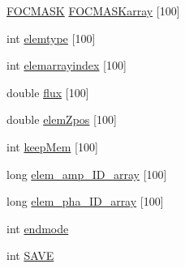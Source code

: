 \begin{DoxyCompactItemize}
\hyperlink{structFOCMASK}{F\+O\+C\+M\+A\+S\+K} \hyperlink{structOPTSYST_a26a60095508ae4850277baccaf2ec5f4}{F\+O\+C\+M\+A\+S\+Karray} \mbox{[}100\mbox{]}
\item 
int \hyperlink{structOPTSYST_a29bcd30a4147808728c0d865e883940f}{elemtype} \mbox{[}100\mbox{]}
\item 
int \hyperlink{structOPTSYST_af9b9474aff4a897ad23cf1aaa297ef42}{elemarrayindex} \mbox{[}100\mbox{]}
\item 
double \hyperlink{structOPTSYST_a4657868c34df790eb6c148a12aef3dd4}{flux} \mbox{[}100\mbox{]}
\item 
double \hyperlink{structOPTSYST_aa58b8090b627985b26d881da1ccc2efc}{elem\+Zpos} \mbox{[}100\mbox{]}
\item 
int \hyperlink{structOPTSYST_a5a24e6c6785830f113c6c32c7572d08e}{keep\+Mem} \mbox{[}100\mbox{]}
\item 
long \hyperlink{structOPTSYST_a01d645e9d9739c79148aa0998424c188}{elem\+\_\+amp\+\_\+\+I\+D\+\_\+array} \mbox{[}100\mbox{]}
\item 
long \hyperlink{structOPTSYST_a82d5cc265a4f32788f756d8035e97346}{elem\+\_\+pha\+\_\+\+I\+D\+\_\+array} \mbox{[}100\mbox{]}
\item 
int \hyperlink{structOPTSYST_a98b8c66b45d6534f830d5cfe9fb39b17}{endmode}
\item 
int \hyperlink{structOPTSYST_a1edeacc3267a9dae94f74a7ae2d5d668}{S\+A\+V\+E}
\end{DoxyCompactItemize}


